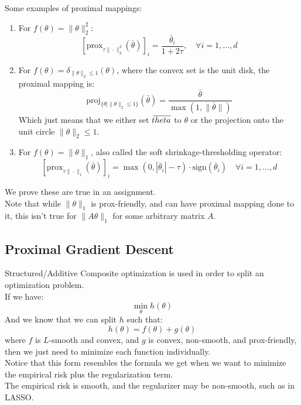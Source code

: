 \documentclass[12pt]{article}
\begin{document}
Some examples of proximal mappings:
\begin{enumerate}
    \item For $f(\theta) = \|\theta\|^2_2$:
    \[ \left[ \text{prox}_{\tau \|\cdot\|_2^2}
    (\bar{\theta}) \right]_i = 
    \frac{\bar{\theta}_i}{1 + 2\tau}, 
    \quad \forall i = 1, \ldots, d \]
    \item For $f(\theta) = 
    \delta_{\|\theta \|_2 \leq 1}(\theta)$,
    where the convex set is the unit disk,
    the proximal mapping is:
    \[ \text{proj}_{\{\theta \mid 
    \|\theta\|_2 \leq 1\}}
    (\bar{\theta}) = \frac{\bar{\theta}}
    {\max(1, \|\bar{\theta}\|)}\]
    Which just means that we either set
    $\,\overline{\!{theta}}$ to $\theta$ or the projection
    onto the unit circle $\|\theta\|_2 \leq 1$.
    \item For $f(\theta) = \|\theta\|_1$,
    also called the soft shrinkage-thresholding 
    operator:
    \[ \left[ \text{prox}_{\tau \|\cdot\|_1}
    (\bar{\theta}) \right]_i = 
    \max(0, |\bar{\theta}_i| - \tau) \cdot 
    \text{sign}(\bar{\theta}_i) 
    \quad \forall i = 1, \ldots, d \]
\end{enumerate}
We prove these are true in an assignment. \\

Note that while $\|\theta\|_1$
is prox-friendly, and can have proximal mapping
done to it,
this isn't true for $\|A \theta\|_1$
for some arbitrary matrix $A$. \\

\newpage

\subsection*{Proximal Gradient Descent}

Structured/Additive Composite optimization
is used in order to split an optimization problem. \\
If we have:
\[ \min_\theta h(\theta) \]
And we know that we can split $h$ such that:
\[ h(\theta) = f(\theta) + g(\theta)\]
where $f$ is $L$-smooth and convex,
and $g$ is convex,
non-smooth, and prox-friendly,
then we just need to minimize each
function individually. \\

Notice that this form
resembles the formula we get
when we want to minimize the empirical risk
plus the regularization term. \\
The empirical risk is smooth, and the regularizer
may be non-smooth, such as in LASSO. \\
\end{document}
